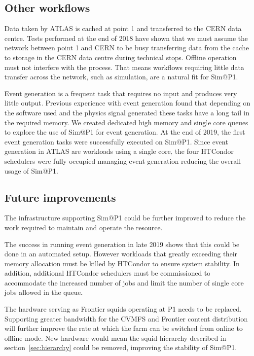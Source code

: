 \documentclass{webofc}
\begin{document}
\subsection{Other workflows}
\label{sec:evgen}
Data taken by ATLAS is cached at point 1 and transferred to the CERN data
centre. Tests performed at the end of
2018 have shown that we must assume the network between point 1 and CERN to be
busy transferring data from the cache to storage in the CERN data centre
during technical stops. Offline operation must not interfere with the process.
That means workflows requiring little data transfer across the network, such as
simulation, are a natural fit for Sim@P1.

Event generation is a frequent task that requires no input and produces very
little output. Previous experience with event generation found that depending on
the software used and the physics signal generated these tasks have a long tail
in the required memory. We created dedicated high memory and single core queues
to explore the use of Sim@P1 for event generation. At the end of 2019, the first
event generation tasks
were successfully executed on Sim@P1. Since event generation
in ATLAS are workloads using a single core, the four HTCondor schedulers were
fully occupied managing event generation reducing the overall usage of Sim@P1.

\subsection{Future improvements}
The infrastructure supporting Sim@P1 could be further improved to reduce the
work required to maintain and operate the resource.

The success in running event generation in late 2019 shows that this could be
done in an automated setup. However workloads that greatly exceeding their
memory
allocation must be killed by HTCondor to ensure system stability. In addition,
additional HTCondor schedulers must be commissioned to accommodate the increased
number of jobs and limit the number of single core jobs allowed in the queue.

The hardware serving as Frontier squids operating at P1 needs to be replaced.
Supporting greater bandwidth for the CVMFS and Frontier content distribution
will further improve the rate at which the farm can be switched from online to
offline mode. New hardware would mean the squid hierarchy described
in section~\ref{sec:hierarchy} could be removed, improving the stability of
Sim@P1.
\end{document}
